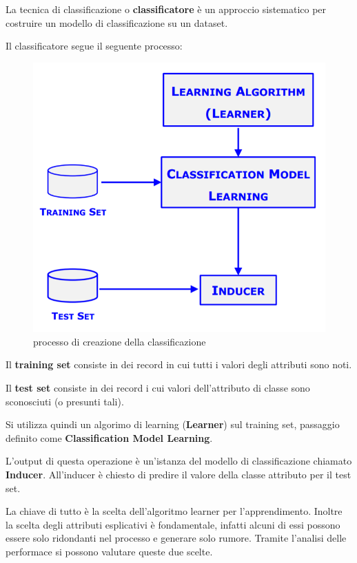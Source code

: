 \begin{defn}
	La tecnica di classificazione o \textbf{classificatore} è un approccio sistematico per costruire un modello di classificazione su un dataset.
\end{defn}
Il classificatore segue il seguente processo:

\begin{figure}[H]
	\centering
	\includegraphics[height=0.6 \linewidth]{classification/pict/class_process.png}
	\caption{processo di creazione della classificazione}
\end{figure}

\begin{defn}
	Il \textbf{training set} consiste in dei record in cui tutti i valori degli attributi sono noti.
\end{defn}

\begin{defn}
	Il \textbf{test set} consiste in dei record i cui valori dell'attributo di classe sono sconosciuti (o presunti tali).
\end{defn}

Si utilizza quindi un algorimo di learning (\textbf{Learner}) sul training set, passaggio definito come \textbf{Classification Model Learning}. 

\begin{defn}
	L'output di questa operazione è un'istanza del modello di classificazione chiamato \textbf{Inducer}. All'inducer è chiesto di predire il valore della classe attributo per il test set. 
\end{defn}

La chiave di tutto è la scelta dell'algoritmo learner per l'apprendimento. Inoltre la scelta degli attributi esplicativi è fondamentale, infatti alcuni di essi possono essere solo ridondanti nel processo e generare solo rumore. Tramite l'analisi delle performace si possono valutare queste due scelte. 

